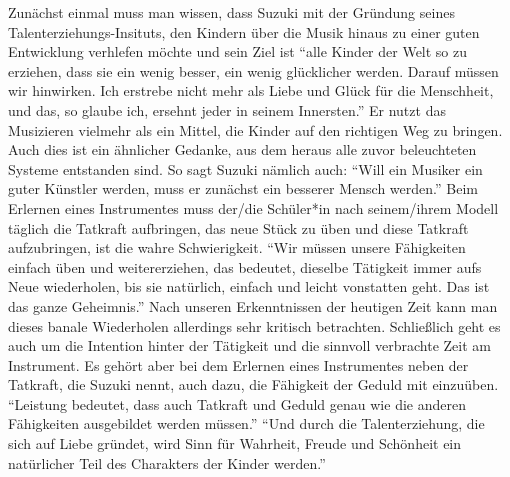 Zunächst einmal muss man wissen, dass Suzuki mit der Gründung seines
Talenterziehungs-Insituts, den Kindern über die Musik hinaus zu einer guten
Entwicklung verhlefen möchte und sein Ziel ist \enquote{alle Kinder der Welt so
zu erziehen, dass sie ein wenig besser, ein wenig glücklicher werden. Darauf
müssen wir hinwirken. Ich erstrebe nicht mehr als Liebe und Glück für die
Menschheit, und das, so glaube ich, ersehnt jeder in seinem Innersten.}
\autocite[103]{suzuki:erziehung_ist_liebe}
Er nutzt das Musizieren vielmehr als ein Mittel, die Kinder auf den richtigen
Weg zu bringen. Auch dies ist ein ähnlicher Gedanke, aus dem heraus alle zuvor
beleuchteten Systeme entstanden sind. So sagt Suzuki nämlich auch: \enquote{Will
ein Musiker ein guter Künstler werden, muss er zunächst ein besserer Mensch
werden.}\autocite[103]{suzuki:erziehung_ist_liebe} Beim Erlernen eines
Instrumentes muss der/die Schüler*in nach seinem/ihrem Modell täglich die Tatkraft
aufbringen, das neue Stück zu üben und diese Tatkraft aufzubringen, ist die wahre
Schwierigkeit.
\enquote{Wir müssen unsere Fähigkeiten einfach üben und weitererziehen, das
bedeutet, dieselbe Tätigkeit immer aufs Neue wiederholen, bis sie natürlich,
einfach und leicht vonstatten geht. Das ist das ganze
Geheimnis.}\autocite[57]{suzuki:erziehung_ist_liebe} Nach unseren Erkenntnissen
der heutigen Zeit kann man dieses banale Wiederholen allerdings sehr kritisch
betrachten. Schließlich geht es auch um die Intention hinter der Tätigkeit und
die sinnvoll verbrachte Zeit am Instrument. Es gehört aber bei dem Erlernen
eines Instrumentes neben der Tatkraft, die Suzuki nennt, auch dazu, die
Fähigkeit der Geduld mit einzuüben. \enquote{Leistung bedeutet, dass auch
Tatkraft und Geduld genau wie die anderen Fähigkeiten ausgebildet werden
müssen.}
\autocite[60]{suzuki:erziehung_ist_liebe}
\enquote{Und durch die Talenterziehung, die sich auf Liebe gründet, wird Sinn
für Wahrheit, Freude und Schönheit ein natürlicher Teil des Charakters der
Kinder werden.} \autocite[75]{suzuki:erziehung_ist_liebe}

